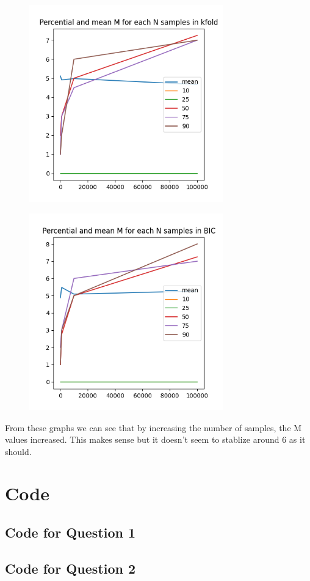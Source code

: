 \documentclass[11pt]{article}
\begin{document}
\begin{figure}[H]
	\centering
	\includegraphics[width=0.75\textwidth]{kfoldper}
	\caption{}
\end{figure}

\begin{figure}[H]
	\centering
	\includegraphics[width=0.75\textwidth]{bicper}
	\caption{}
\end{figure}

From these graphs we can see that by increasing the number of samples, the M values increased.
This makes sense but it doesn't seem to stablize around 6 as it should.

\section*{Code}
\subsection*{Code for Question 1}


\subsection*{Code for Question 2}

\end{document}
